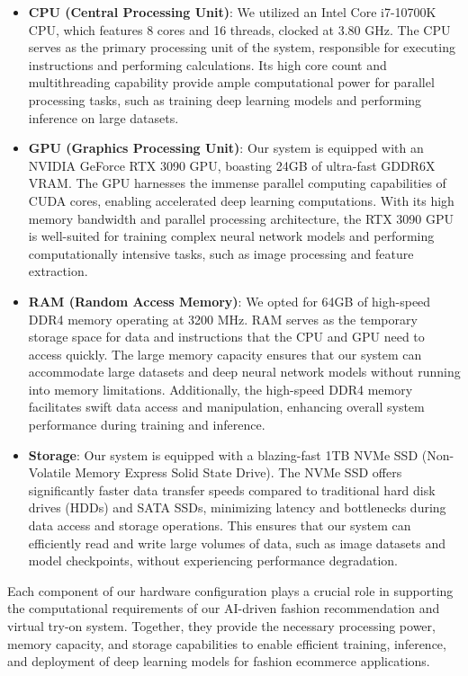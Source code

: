 \begin{itemize}
  \item \textbf{CPU (Central Processing Unit)}: We utilized an Intel Core i7-10700K CPU, which features 8 cores and 16 threads, clocked at 3.80 GHz. The CPU serves as the primary processing unit of the system, responsible for executing instructions and performing calculations. Its high core count and multithreading capability provide ample computational power for parallel processing tasks, such as training deep learning models and performing inference on large datasets.
  
  \item \textbf{GPU (Graphics Processing Unit)}: Our system is equipped with an NVIDIA GeForce RTX 3090 GPU, boasting 24GB of ultra-fast GDDR6X VRAM. The GPU harnesses the immense parallel computing capabilities of CUDA cores, enabling accelerated deep learning computations. With its high memory bandwidth and parallel processing architecture, the RTX 3090 GPU is well-suited for training complex neural network models and performing computationally intensive tasks, such as image processing and feature extraction.
  
  \item \textbf{RAM (Random Access Memory)}: We opted for 64GB of high-speed DDR4 memory operating at 3200 MHz. RAM serves as the temporary storage space for data and instructions that the CPU and GPU need to access quickly. The large memory capacity ensures that our system can accommodate large datasets and deep neural network models without running into memory limitations. Additionally, the high-speed DDR4 memory facilitates swift data access and manipulation, enhancing overall system performance during training and inference.
  
  \item \textbf{Storage}: Our system is equipped with a blazing-fast 1TB NVMe SSD (Non-Volatile Memory Express Solid State Drive). The NVMe SSD offers significantly faster data transfer speeds compared to traditional hard disk drives (HDDs) and SATA SSDs, minimizing latency and bottlenecks during data access and storage operations. This ensures that our system can efficiently read and write large volumes of data, such as image datasets and model checkpoints, without experiencing performance degradation.
\end{itemize}

Each component of our hardware configuration plays a crucial role in supporting the computational requirements of our AI-driven fashion recommendation and virtual try-on system. Together, they provide the necessary processing power, memory capacity, and storage capabilities to enable efficient training, inference, and deployment of deep learning models for fashion ecommerce applications.

